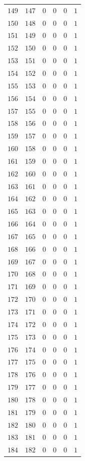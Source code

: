 {\begin{longtable}{@{}r r r r r c@{}}
\(149\) & \(147\) & 0 & 0 & 0 & \(1\) \\
\(150\) & \(148\) & 0 & 0 & 0 & \(1\) \\
\(151\) & \(149\) & 0 & 0 & 0 & \(1\) \\
\(152\) & \(150\) & 0 & 0 & 0 & \(1\) \\
\(153\) & \(151\) & 0 & 0 & 0 & \(1\) \\
\(154\) & \(152\) & 0 & 0 & 0 & \(1\) \\
\(155\) & \(153\) & 0 & 0 & 0 & \(1\) \\
\(156\) & \(154\) & 0 & 0 & 0 & \(1\) \\
\(157\) & \(155\) & 0 & 0 & 0 & \(1\) \\
\(158\) & \(156\) & 0 & 0 & 0 & \(1\) \\
\(159\) & \(157\) & 0 & 0 & 0 & \(1\) \\
\(160\) & \(158\) & 0 & 0 & 0 & \(1\) \\
\(161\) & \(159\) & 0 & 0 & 0 & \(1\) \\
\(162\) & \(160\) & 0 & 0 & 0 & \(1\) \\
\(163\) & \(161\) & 0 & 0 & 0 & \(1\) \\
\(164\) & \(162\) & 0 & 0 & 0 & \(1\) \\
\(165\) & \(163\) & 0 & 0 & 0 & \(1\) \\
\(166\) & \(164\) & 0 & 0 & 0 & \(1\) \\
\(167\) & \(165\) & 0 & 0 & 0 & \(1\) \\
\(168\) & \(166\) & 0 & 0 & 0 & \(1\) \\
\(169\) & \(167\) & 0 & 0 & 0 & \(1\) \\
\(170\) & \(168\) & 0 & 0 & 0 & \(1\) \\
\(171\) & \(169\) & 0 & 0 & 0 & \(1\) \\
\(172\) & \(170\) & 0 & 0 & 0 & \(1\) \\
\(173\) & \(171\) & 0 & 0 & 0 & \(1\) \\
\(174\) & \(172\) & 0 & 0 & 0 & \(1\) \\
\(175\) & \(173\) & 0 & 0 & 0 & \(1\) \\
\(176\) & \(174\) & 0 & 0 & 0 & \(1\) \\
\(177\) & \(175\) & 0 & 0 & 0 & \(1\) \\
\(178\) & \(176\) & 0 & 0 & 0 & \(1\) \\
\(179\) & \(177\) & 0 & 0 & 0 & \(1\) \\
\(180\) & \(178\) & 0 & 0 & 0 & \(1\) \\
\(181\) & \(179\) & 0 & 0 & 0 & \(1\) \\
\(182\) & \(180\) & 0 & 0 & 0 & \(1\) \\
\(183\) & \(181\) & 0 & 0 & 0 & \(1\) \\
\(184\) & \(182\) & 0 & 0 & 0 & \(1\) \\
\end{longtable}
}
\endgroup
